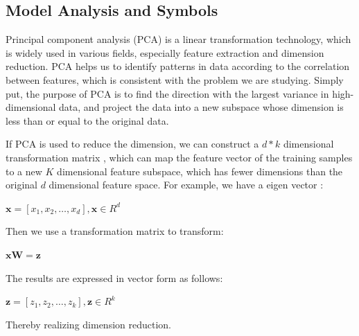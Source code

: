 \documentclass{swmcmthesis}
\begin{document}
\subsection{Model Analysis and Symbols}
\hspace{1.25em}Principal component analysis (PCA) is a linear transformation technology, which is widely used in various fields, especially feature extraction and dimension reduction. PCA helps us to identify patterns in data according to the correlation between features, which is consistent with the problem we are studying. Simply put, the purpose of PCA is to find the direction with the largest variance in high-dimensional data, and project the data into a new subspace whose dimension is less than or equal to the original data.
\par 
If PCA is used to reduce the dimension, we can construct a $d*k$ dimensional transformation matrix  , which can map the feature vector  of the training samples to a new $K$ dimensional feature subspace, which has fewer dimensions than the original $d$ dimensional feature space. For example, we have a eigen vector :
\begin{center}
    $\mathbf{x}=[x_1,x_2,\dots,x_d], \mathbf{x}\in R^d$
\end{center}
\par 
Then we use a transformation matrix  to transform:
\begin{center}
    $\mathbf{x}\mathbf{W}=\mathbf{z}$
\end{center}
\par 
The results are expressed in vector form as follows:
\begin{center}
    $\mathbf{z}=[z_1,z_2,\dots,z_k], \mathbf{z}\in R^k$
\end{center}
\par
Thereby realizing dimension reduction.
\end{document}

